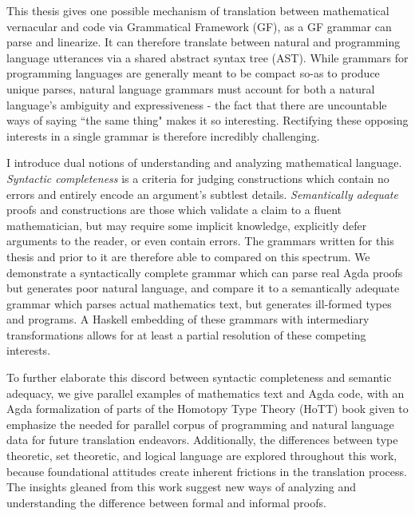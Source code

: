 \documentclass[11pt, a4paper]{article}
\begin{document}
This thesis gives one possible mechanism of translation between mathematical
vernacular and code via Grammatical Framework (GF), as a GF grammar can parse
and linearize. It can therefore translate between natural and programming
language utterances via a shared abstract syntax tree (AST). While grammars for
programming languages are generally meant to be compact so-as to produce unique
parses, natural language grammars must account for both a natural language's
ambiguity and expressiveness - the fact that there are uncountable ways of
saying ``the same thing" makes it so interesting. Rectifying these opposing
interests in a single grammar is therefore incredibly challenging.

I introduce dual notions of understanding and analyzing mathematical language.
\emph{Syntactic completeness} is a criteria for judging constructions which
contain no errors and entirely encode an argument's subtlest details.
\emph{Semantically adequate} proofs and constructions are those which validate a
claim to a fluent mathematician, but may require some implicit knowledge,
explicitly defer arguments to the reader, or even contain errors. The grammars
written for this thesis and prior to it are therefore able to compared on this
spectrum. We demonstrate a syntactically complete grammar which can parse real
Agda proofs but generates poor natural language, and compare it to a
semantically adequate grammar which parses actual mathematics text, but
generates ill-formed types and programs. A Haskell embedding of these grammars
with intermediary transformations allows for at least a partial resolution of
these competing interests.

To further elaborate this discord between syntactic completeness and semantic
adequacy, we give parallel examples of mathematics text and Agda code,
with an Agda formalization of parts of the Homotopy Type Theory (HoTT) book
given to emphasize the needed for parallel corpus of programming and natural
language data for future translation endeavors. Additionally, the differences
between type theoretic, set theoretic, and logical language are explored
throughout this work, because foundational attitudes create inherent frictions
in the translation process. The insights gleaned from this work suggest new ways of
analyzing and understanding the difference between formal and informal proofs.

\thispagestyle{empty}

\newpage
\end{document}
